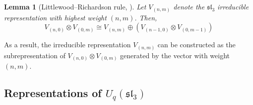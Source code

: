 \documentclass[12pt,oneside,reqno]{amsart}
\newtheorem{lema}{\bf Lemma}
\numberwithin{teorema}{section}
\numberwithin{definicion}{section}
\numberwithin{lema}{section}
\numberwithin{conjetura}{section}
\numberwithin{proposicion}{section}
\def\sl{\mathfrak{sl}}
\def\Uq{U_q}
\begin{document}
\begin{lema}[Littlewood--Richardson rule, \cite{Littlewood-Richardson}]\label{lemma:LR-rule} Let $V_{(n,m)}$ denote the $\sl_3$ irreducible representation with highest weight $(n,m)$. Then,
    \begin{equation}\label{eq:tensorprod-decomposition-classical}
        V_{(n,0)}\otimes V_{(0,m)} \cong V_{(n,m)} \oplus \left(V_{(n-1,0)}\otimes V_{(0,m-1)} \right)
\end{equation}
\end{lema}

As a result, the irreducible representation $V_{(n,m)}$ can be constructed as the subrepresentation of $V_{(n,0)}\otimes V_{(0,m)}$ generated by the vector with weight $(n,m)$.


\subsection{Representations of \texorpdfstring{$\Uq(\sl_3)$}{Uqsl3}}
\end{document}
